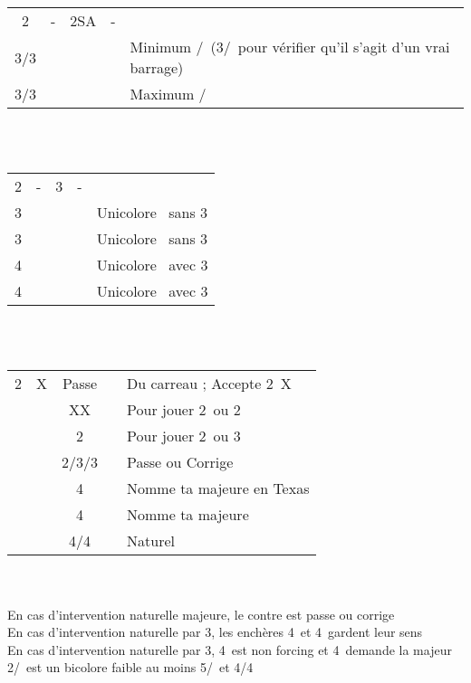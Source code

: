 \documentclass[a4paper, oneside, 11pt]{report}
\begin{document}
	\begin{tabular}{cccc|l}
	2\carreau & - & 2SA & - &\\
	3\trefle/3\carreau &&&& Minimum \coeur/\pique\ (3\carreau/\coeur\ pour vérifier qu'il s'agit d'un vrai barrage)\\
	3\coeur/3\pique &&&& Maximum \pique/\coeur\\
	\end{tabular}\\\\
	
	\begin{tabular}{cccc|l}
	2\carreau & - & 3\carreau & - &\\
	3\coeur &&&& Unicolore \coeur\ sans 3\pique\\
	3\pique &&&& Unicolore \pique\ sans 3\coeur\\
	4\trefle &&&& Unicolore \coeur\ avec 3\pique\\
	4\carreau &&&& Unicolore \pique\ avec 3\coeur\\
	\end{tabular}\\\\

	\begin{tabular}{cccc|l}
	2\carreau & X & Passe && Du carreau ; Accepte 2\carreau\ X\\
	&& XX && Pour jouer 2\coeur\ ou 2\pique\\
	&& 2\coeur && Pour jouer 2\coeur\ ou 3\pique\\
	&& 2\pique/3\coeur/3\pique && Passe ou Corrige\\
	&& 4\trefle && Nomme ta majeure en Texas\\
	&& 4\carreau && Nomme ta majeure\\
	&& 4\coeur/4\pique && Naturel\\
	\end{tabular}\\\\
	En cas d'intervention naturelle majeure, le contre est passe ou corrige\\	
	En cas d'intervention naturelle par 3\trefle, les enchères 4\trefle\ et 4\carreau\ gardent leur sens\\	
	En cas d'intervention naturelle par 3\carreau, 4\trefle\ est non forcing et 4\carreau\ demande la majeur\\

\newpage
	2\coeur/\pique\ est un bicolore faible au moins 5\coeur/\pique\ et 4\trefle/4\carreau\\
\end{document}
